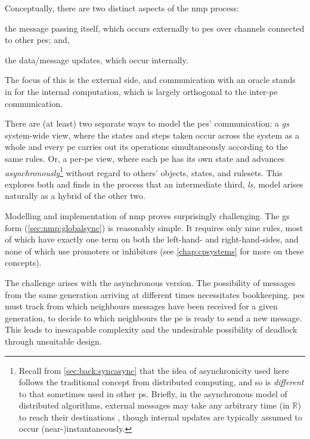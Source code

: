 Conceptually, there are two distinct aspects of the \gls{nmp} process:
\begin{inparaenum}
\item the message passing itself, which occurs externally to \glspl{pe} over channels connected to other \glspl{pe}; and,
\item the data/message updates, which occur internally.
\end{inparaenum}
The focus of this  is the external side, and communication with an oracle stands in for the internal computation, which is largely orthogonal to the inter-\gls{pe} communication.

There are (at least) two separate ways to model the \glspl{pe}' communication:  a \emph{\gls{gs}} system-wide view, where the states and steps taken occur across the system as a whole and every \gls{pe} carries out its operations simultaneously according to the same rules.  Or, a per-\gls{pe} view, where each \gls{pe} has its own state and advances \emph{asynchronously}\footnote{Recall from \vref{sec:back:syncasync} that the idea of asynchronicity used here follows the traditional concept from distributed computing, and so is \emph{different} to that sometimes used in other \gls{ps}.  Briefly, in the asynchronous model of distributed algorithms, external messages may take any arbitrary time (in \(\mathbb{R}\)) to reach their destinations \cite{Balanescu2011,Nicolescu2014,Lynch1996}, though internal updates are typically assumed to occur (near-)instantaneously.} without regard to others' objects, states, and \glspl{ruleset}.  This  explores both and finds in the process that an intermediate third, \emph{\gls{ls}}, model arises naturally as a hybrid of the other two.

Modelling and implementation of \gls{nmp} proves surprisingly challenging.  The \gls{gs} form (\cref{sec:nmp:globalsync}) is reasonably simple.  It requires only nine rules, most of which have exactly one term on both the left-hand- and right-hand-sides, and none of which use \glspl{promoter} or \glspl{inhibitor} (see \cref{chap:cpsystems} for more on these concepts).

The challenge arises with the asynchronous version.  The possibility of messages from the same generation arriving at different times necessitates bookkeeping.
\Glspl{pe} must track from which neighbours messages have been received for a given generation, to decide to which neighbours the \gls{pe} is ready to send a new message.
This leads to inescapable complexity and the undesirable possibility of deadlock through unsuitable design.

